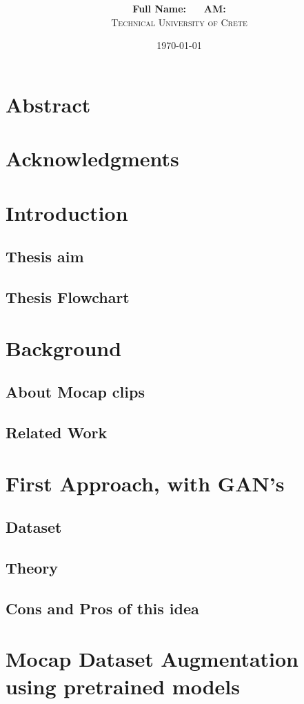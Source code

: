 \documentclass{article}
\title{\underline{\textbf{\assignmentNumber}}}
\author{\textbf{Full Name:}  \studentName \ \ \ \textsc{\textbf{ΑΜ:}}  \studentNumber\\
	\textsc{Technical University of Crete}}
\date{\today}
\begin{document}
	\maketitle
\section*{Abstract}
\section*{Acknowledgments}
\section{Introduction}
\subsection{Thesis aim}
\subsection{Thesis Flowchart}
\section{Background}
\subsection{About Mocap clips}
\subsection{Related Work}
\section{First Approach, with GAN's}
\subsection{Dataset}
\subsection{Theory}
\subsection{Cons and Pros of this idea}
\section{Mocap Dataset Augmentation using pretrained models}
\end{document}
